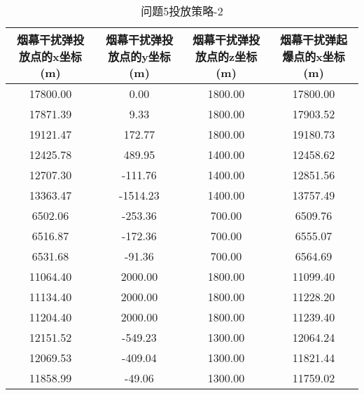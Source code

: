 \documentclass[../main.tex]{subfiles}
\begin{document}
\begin{table}[H]
\caption{问题5投放策略-2}
\label{tab:031} 
\centering
\begin{scriptsize}
\begin{tabular}{cccc}
\toprule[1.5pt]
烟幕干扰弹投放点的x坐标 (m) & 烟幕干扰弹投放点的y坐标 (m) & 烟幕干扰弹投放点的z坐标 (m) & 烟幕干扰弹起爆点的x坐标 (m) \\
\midrule[1pt]
17800.00 & 0.00  & 1800.00 & 17800.00 \\  %
17871.39 & 9.33  & 1800.00 & 17903.52 \\  %
19121.47 & 172.77& 1800.00 & 19180.73 \\  %
12425.78 & 489.95& 1400.00 & 12458.62 \\  %
12707.30 & -111.76&1400.00 & 12851.56 \\  %
13363.47 & -1514.23&1400.00& 13757.49 \\  %
6502.06  & -253.36&700.00  & 6509.76  \\  %
6516.87  & -172.36&700.00  & 6555.07  \\  %
6531.68  & -91.36 &700.00  & 6564.69  \\  %
11064.40 & 2000.00&1800.00 & 11099.40 \\  %
11134.40 & 2000.00&1800.00 & 11228.20 \\  %
11204.40 & 2000.00&1800.00 & 11239.40 \\  %
12151.52 & -549.23&1300.00 & 12064.24 \\  %
12069.53 & -409.04&1300.00 & 11821.44 \\  %
11858.99 & -49.06 &1300.00 & 11759.02 \\  %
\bottomrule[1.5pt]
\end{tabular}
\end{scriptsize}
\end{table}
\end{document}
